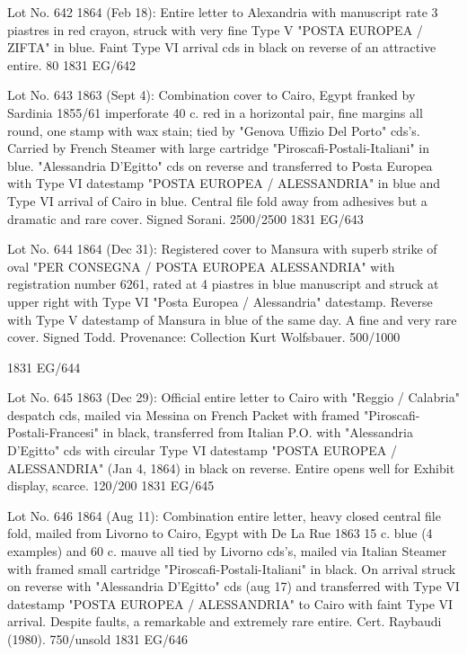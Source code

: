 \documentclass[justified]{tufte-book}
\begin{document}
%
{Lot No. 642
1864 (Feb 18): Entire letter to Alexandria with manuscript rate 3 piastres in red crayon, struck with very fine Type V "POSTA EUROPEA / ZIFTA" in blue. Faint Type VI arrival cds in black on reverse of an attractive entire. 80 
}%
{1831}%
{EG/642}%
{}%
{}
{}%
{}

%
{Lot No. 643
1863 (Sept 4): Combination cover to Cairo, Egypt franked by Sardinia 1855/61 imperforate 40 c. red in a horizontal pair, fine margins all round, one stamp with wax stain; tied by "Genova Uffizio Del Porto" cds's. Carried by French Steamer with large cartridge "Piroscafi-Postali-Italiani" in blue. "Alessandria D'Egitto" cds on reverse and transferred to Posta Europea with Type VI datestamp "POSTA EUROPEA / ALESSANDRIA" in blue and Type VI arrival of Cairo in blue. Central file fold away from adhesives but a dramatic and rare cover. Signed Sorani. 2500/2500 
}%
{1831}%
{EG/643}%
{}%
{}
{}%
{}


%
{Lot No. 644
1864 (Dec 31): Registered cover to Mansura with superb strike of oval "PER CONSEGNA / POSTA EUROPEA ALESSANDRIA" with registration number 6261, rated at 4 piastres in blue manuscript and struck at upper right with Type VI "Posta Europea / Alessandria" datestamp. Reverse with Type V datestamp of Mansura in blue of the same day. A fine and very rare cover. Signed Todd. Provenance: Collection Kurt Wolfsbauer.  500/1000

}%
{1831}%
{EG/644}%
{}%
{}
{}%
{}



%
{Lot No. 645
1863 (Dec 29): Official entire letter to Cairo with "Reggio / Calabria" despatch cds, mailed via Messina on French Packet with framed "Piroscafi-Postali-Francesi" in black, transferred from Italian P.O. with "Alessandria D'Egitto" cds with circular Type VI datestamp "POSTA EUROPEA / ALESSANDRIA" (Jan 4, 1864) in black on reverse. Entire opens well for Exhibit display, scarce. 120/200}%
{1831}%
{EG/645}%
{}%
{}
{}%
{}







%
{Lot No. 646
1864 (Aug 11): Combination entire letter, heavy closed central file fold, mailed from Livorno to Cairo, Egypt with De La Rue 1863 15 c. blue (4 examples) and 60 c. mauve all tied by Livorno cds's, mailed via Italian Steamer with framed small cartridge "Piroscafi-Postali-Italiani" in black. On arrival struck on reverse with "Alessandria D'Egitto" cds (aug 17) and transferred with Type VI datestamp "POSTA EUROPEA / ALESSANDRIA" to Cairo with faint Type VI arrival. Despite faults, a remarkable and extremely rare entire. Cert. Raybaudi (1980). 750/unsold
 }%
{1831}%
{EG/646}%
{}%
{}
{}%
{}
\end{document}
